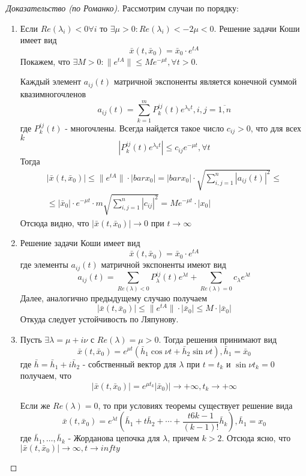 \begin{proof}[Доказательство (по Романко)]
	Рассмотрим случаи по порядку:
	\begin{enumerate}
		\item Если $Re(\lambda_i)<0 \forall i$ то $\exists \mu >0 : Re(\lambda_i)< -2\mu < 0$. Решение задачи Коши имеет вид 
		\[
			\bar{x}(t, \bar{x}_0) = \bar{x}_0\cdot e^{tA}
		\]
		Покажем, что $\exists M>0: \|e^{tA}\| \leqslant Me^{-\mu t}, \forall t>0$.
		
		Каждый элемент $a_{ij}(t)$ матричной экспоненты является конечной суммой квазимногочленов
		\[
			a_{ij}(t) = \sum_{k=1}^m P_k^{ij}(t)e^{\lambda_kt}, i,j=\overline{1,n}
		\]
		где $P_k^{ij}(t)$ - многочлены. Всегда найдется такое число $c_{ij}>0$, что для всех $k$
		\[
			|P_k^{ij}(t)e^{\lambda_kt}|\leqslant c_{ij}e^{-\mu t}, \forall t
		\]
		Тогда
		\begin{multline*}
		|\bar{x}(t, \bar{x}_0)|\leqslant \|e^{tA}\|\cdot|bar{x}_0| = |bar{x}_0|\cdot\sqrt{\sum_{i,j=1}^n|a_{ij}(t)|^2}\leqslant\\\leqslant|\bar{x}_0|\cdot e^{-\mu t}\cdot m \sqrt{\sum_{i,j=1}^n|c_{ij}|^2} = Me^{-\mu t}\cdot |x_0|
		\end{multline*}
		Отсюда видно, что $|\bar{x}(t, \bar{x}_0)| \to 0$ при $t \to \infty$
	\item 
		Решение задачи Коши имеет вид 
		\[
		\bar{x}(t, \bar{x}_0) = \bar{x}_0\cdot e^{tA}
		\]
		где элементы $a_{ij}(t)$ матричной экспоненты имеют вид
		\[
			a_{ij}(t) = \sum_{Re(\lambda) < 0}P_\lambda^{ij}(t)e^{\lambda t} + \sum_{Re(\lambda)=0}c_\lambda e^{\lambda t}
		\]
		Далее, аналогично предыдущему случаю получаем
		\[
			|\bar{x}(t, \bar{x}_0)| \leqslant \|e^{tA}\|\cdot|\bar{x}_0| \leqslant M\cdot|\bar{x}_0| 
		\]
		Откуда следует устойчивость по Ляпунову.
	\item
		Пусть $\exists \lambda = \mu + i \nu$ с $Re(\lambda) = \mu >0$. Тогда решения принимают вид
		\[
			\bar{x}(t, \bar{x}_0) = e^{\mu t}(\bar{h}_1\cos{\nu t}+ \bar{h}_2\sin{\nu t}), \bar{h}_1 = \bar{x}_0
		\]
		где $\bar{h} = \bar{h}_1 + i\bar{h}_2$ - собственный вектор для $\lambda$ при $t = t_k$ и $\sin{\nu t_k} = 0$ получаем, что
		\[
			|\bar{x}(t, \bar{x}_0)| = e^{\mu t_k}|\bar{x}_0)| \to +\infty, t_k\to+\infty
		\]
		
		Если же $Re(\lambda) = 0$, то при условиях теоремы существует решение вида
		\[
			\bar{x}(t, \bar{x}_0) = e^{\lambda t}\left( \bar{h}_1 + t\bar{h}_2 + \cdots + \frac{t6{k-1}}{(k-1)!}\bar{h}_k\right), \bar{h}_1=x_0
		\]
		где $\bar{h}_1, \dots,\bar{h}_k$ - Жорданова цепочка для $\lambda$, причем $k>2$. Отсюда ясно, что $|\bar{x}(t, \bar{x}_0)| \to \infty, t\to infty$
		
	\end{enumerate}
\end{proof}
